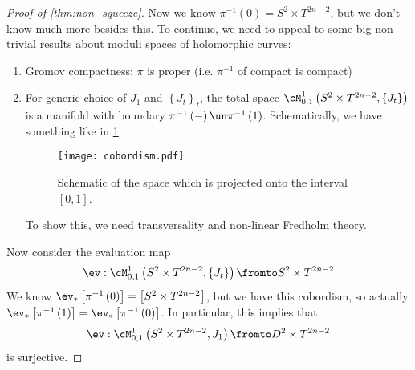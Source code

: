 \documentclass{amsart}
\begin{document}
\begin{proof}[Proof of \cref{thm:non_squeeze}]
Now we know $\pi^{-1}\left( 0 \right) = S^2 \times T^{2n-2}$, but we don't
know much more besides this. 
To continue, we need to appeal to some big non-trivial results about moduli spaces
of holomorphic curves:
\begin{enumerate}
\item Gromov compactness: $\pi$ is proper (i.e. $\pi^{-1}$ of compact is compact)
\item For generic choice of $J_1$ and $\left\{ J_t \right\}_t$, the total space
$\cM_{0,1}^1\left( S^2 \times T^{2n-2} , \left\{ J_t \right\} \right)$
is a manifold with boundary $\pi^{-1}\left( - \right) \un \pi^{-1}\left( 1 \right)$.
Schematically, we have something like in \cref{fig:cobordism}.
\begin{figure}
\texttt{[image: cobordism.pdf]}
\caption{Schematic of the space which is projected onto the interval $\left[ 0,1 \right]$.}
\label{fig:cobordism}
\end{figure}
To show this, we need transversality and non-linear Fredholm theory.
\end{enumerate}
Now consider the evaluation map
\begin{equation}
\ev: \cM_{0,1}^1\left( S^2 \times T^{2n-2} , \left\{ J_t \right\} \right) \fromto
S^2 \times T^{2n-2}
\end{equation}
We know $\ev_*\left[ \pi^{-1}\left( 0 \right) \right] = \left[ S^2 \times T^{2n-2} \right]$, 
but we have this cobordism, so actually
$\ev_*\left[ \pi^{-1}\left( 1 \right) \right] = \ev_*\left[ \pi^{-1}\left( 0 \right) \right]$.
In particular, this implies that
\begin{equation}
\ev: \cM_{0,1}^1\left( S^2 \times T^{2n-2} , J_1 \right) \fromto
D^2 \times T^{2n-2}
\end{equation}
is surjective.


\end{proof}
\end{document}

